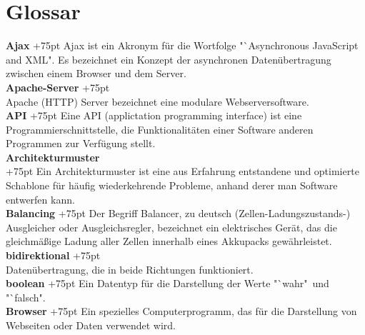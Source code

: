 \documentclass[fontsize = 12pt, paper = a4]{scrreprt}
\begin{document}

\chapter*{Glossar}

\textbf{Ajax}
\hangindent+75pt 
\hspace*{13.5mm}
Ajax ist ein Akronym für die Wortfolge "`Asynchronous JavaScript and XML". Es bezeichnet ein Konzept der asynchronen Datenübertragung zwischen einem Browser und dem Server.\\

\textbf{Apache-Server}
\hangindent+75pt 
\\
Apache (HTTP) Server bezeichnet eine modulare Webserversoftware.\\

\textbf{API}
\hangindent+75pt 
\hspace*{13.5mm}
Eine API (applictation programming interface) ist eine Programmierschnittstelle, die Funktionalitäten einer Software anderen Programmen zur Verfügung stellt.\\

\textbf{Architekturmuster} \\
\hangindent+75pt  
Ein Architekturmuster ist eine aus Erfahrung entstandene und optimierte Schablone für häufig wiederkehrende Probleme, anhand derer man Software entwerfen kann.\\

\textbf{Balancing}
\hangindent+75pt 
\hspace*{3.5mm}
Der Begriff Balancer, zu deutsch (Zellen-Ladungszustands-) Ausgleicher oder Ausgleichsregler, bezeichnet ein elektrisches Gerät, das die gleichmäßige Ladung aller Zellen innerhalb eines Akkupacks gewährleistet.\\

\textbf{bidirektional}
\hangindent+75pt  \\
Datenübertragung, die in beide Richtungen funktioniert. \\

\textbf{boolean}
\hangindent+75pt  
\hspace*{7.5mm}
Ein Datentyp für die Darstellung der Werte "`wahr"\ und "`falsch".\\

\textbf{Browser}
\hangindent+75pt 
\hspace*{6.5mm}
Ein spezielles Computerprogramm, das für die Darstellung von Webseiten oder Daten verwendet wird.\\
\end{document}
